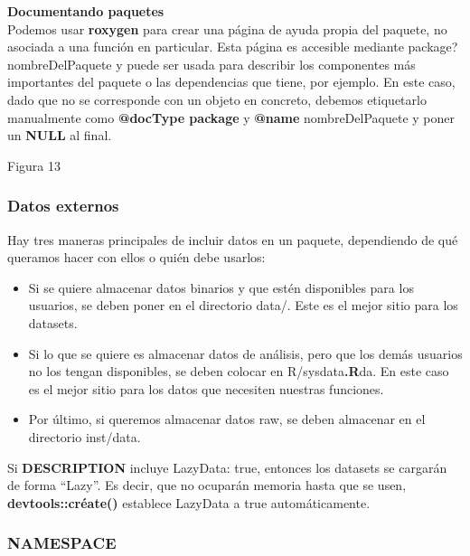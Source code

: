 \textbf{Documentando paquetes}\\

Podemos usar \textbf{roxygen} para crear una p\'agina de ayuda propia del paquete, no asociada a
una funci\'on en particular. Esta p\'agina es accesible mediante package?nombreDelPaquete y
puede ser usada para describir los componentes m\'as importantes del paquete o las
dependencias que tiene, por ejemplo.
En este caso, dado que no se corresponde con un objeto en concreto, debemos etiquetarlo
manualmente como \textbf{@docType package} y \textbf{@name} nombreDelPaquete y poner un \textbf{NULL} al
final.

Figura 13\\

\subsubsection{Datos externos}

Hay tres maneras principales de incluir datos en un paquete, dependiendo de qu\'e queramos
hacer con ellos o qui\'en debe usarlos:

\begin{itemize}
    \item Si se quiere almacenar datos binarios y que est\'en disponibles para los usuarios, se
deben poner en el directorio data/. Este es el mejor sitio para los datasets.
    \item Si lo que se quiere es almacenar datos de an\'alisis, pero que los dem\'as usuarios no
los tengan disponibles, se deben colocar en R/sysdata\textbf{.R}da. En este caso es el mejor
sitio para los datos que necesiten nuestras funciones.
    \item Por \'ultimo, si queremos almacenar datos raw, se deben almacenar en el directorio
inst/data.
\end{itemize}

Si \textbf{DESCRIPTION} incluye LazyData: true, entonces los datasets se cargar\'an de forma
“Lazy”. Es decir, que no ocupar\'an memoria hasta que se usen, \textbf{devtools::cr\'eate()} establece
LazyData a true autom\'aticamente.

\subsubsection{NAMESPACE}

